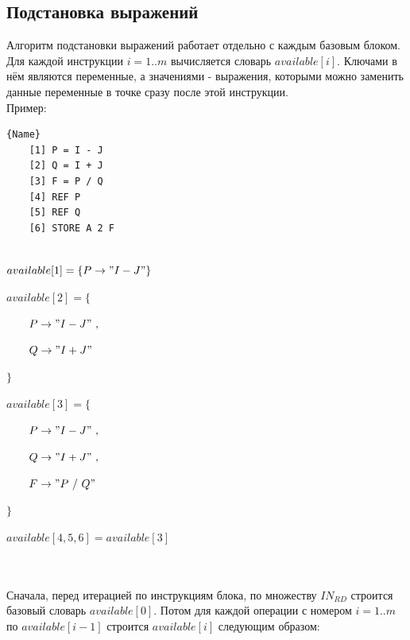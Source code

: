\documentclass{article}
\begin{document}
\subsection{Подстановка выражений}
Алгоритм подстановки выражений работает отдельно с каждым базовым блоком. Для каждой инструкции $i = 1..m$ вычисляется словарь $available[i]$.
Ключами в нём являются переменные, а значениями - выражения, которыми можно заменить данные переменные в точке сразу после этой инструкции.\\
Пример:\\


\begin{minipage}{.45\textwidth}
\begin{lstlisting}[frame=shadowbox]{Name}
    [1] P = I - J
    [2] Q = I + J
    [3] F = P / Q
    [4] REF P
    [5] REF Q
    [6] STORE A 2 F
  
\end{lstlisting}
\end{minipage}\hfill
\begin{minipage}{.43\textwidth}
    $available[1] = \{ P \rightarrow "I - J" \}$

    $available[2] = \{ $
        
        $\qquad P \rightarrow "I - J"\ , $
        
        $\qquad Q \rightarrow "I + J"$

    $\}$

    $available[3] = \{$
        
        $\qquad P \rightarrow "I - J"\ , $
        
        $\qquad Q \rightarrow "I + J"\ ,$

        $\qquad F \rightarrow "P\ /\ Q"\ $

    $\}$


    $available[4, 5, 6] = available[3]$

\end{minipage}\\\\


Сначала, перед итерацией по инструкциям блока, по множеству $IN_{RD}$ строится базовый словарь $available[0]$. Потом для каждой операции с номером $i = 1..m$ по $available[i-1]$ строится $available[i]$ следующим образом:
\end{document}
